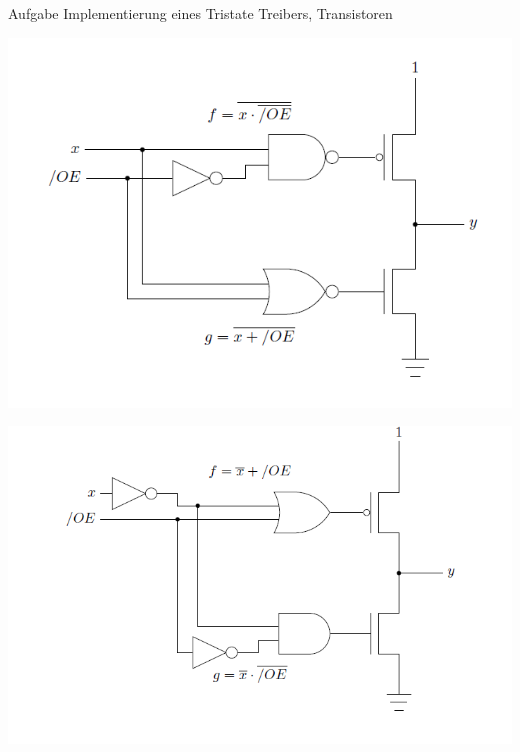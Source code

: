     \begin{frame}[allowframebreaks]{Aufgabe \thesection}{Implementierung eines Tristate Treibers, Transistoren}
      \begin{solutionnoinc}
        \includegraphics[height=0.5\paperheight, center]{./figures/Tristate-Treiber-Schlatkreis.png}
      \end{solutionnoinc}
      \begin{solution}
        \includegraphics[height=0.5\paperheight, center]{./figures/Tristate-Treiber-Schlatkreis-Alternative.png}\\
      \end{solution}
    \end{frame}
